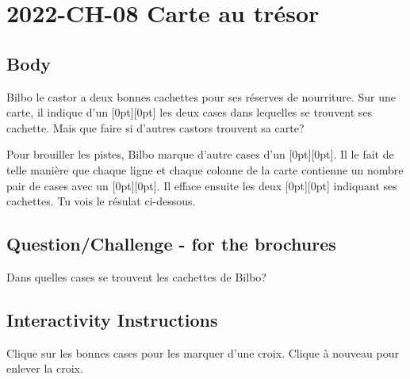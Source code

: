 \documentclass[a4paper,11pt]{report}
\newcommand{\taskGraphicsFolder}{..}
\begin{document}
\section*{\centering{} 2022-CH-08 Carte au trésor}


\subsection*{Body}

Bilbo le castor a deux bonnes cachettes pour ses réserves de nourriture. Sur une carte, il indique d’un \raisebox{\dimexpr -0.5ex +0.3ex \relax}[0pt][0pt]{} les deux cases dans lequelles se trouvent ses cachette. Mais que faire si d’autres castors trouvent sa carte?

Pour brouiller les pistes, Bilbo marque d’autre cases d’un \raisebox{\dimexpr -0.5ex +0.3ex \relax}[0pt][0pt]{}. Il le fait de telle manière que chaque ligne et chaque colonne de la carte contienne un nombre pair de cases avec un \raisebox{\dimexpr -0.5ex +0.3ex \relax}[0pt][0pt]{}. Il efface ensuite les deux \raisebox{\dimexpr -0.5ex +0.3ex \relax}[0pt][0pt]{} indiquant ses cachettes. Tu vois le résulat ci-dessous.

{\em


\subsection*{Question/Challenge - for the brochures}

Dans quelles cases se trouvent les cachettes de Bilbo?

{\centering%
\par}

}


\subsection*{Interactivity Instructions}

Clique sur les bonnes cases pour les marquer d’une croix. Clique à nouveau pour enlever la croix.

\begingroup
\renewcommand{\arraystretch}{1.5}
\end{document}

